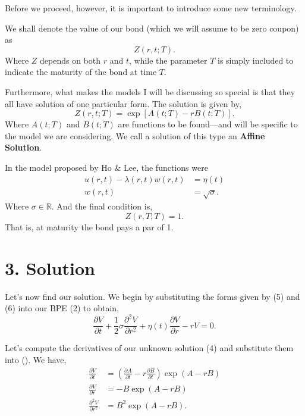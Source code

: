 \documentclass[11pt]{article}
\begin{document}
Before we proceed, however, it is important to introduce some new terminology.

We shall denote the value of our bond (which we will assume to be zero coupon) as
\begin{equation}
    Z(r,t;T).
\end{equation}
Where $Z$ depends on both $r$ and $t$, while the parameter $T$ is simply included to indicate the maturity of the bond at time $T$.

Furthermore, what makes the models I will be discussing so special is that they all have solution of one particular form. The solution is given by,
\begin{equation}
    Z(r,t;T) = \exp \left[A(t;T) - r B(t;T) \right].
\end{equation}
Where $A(t;T)$ and $B(t;T)$ are functions to be found––and will be specific to the model we are considering. We call a solution of this type an \textbf{Affine Solution}.

In the model proposed by Ho \& Lee, the functions were
\begin{align}
    u(r,t) - \lambda(r,t) w(r,t) &= \eta(t) \\
    w(r,t) &= \sqrt{\sigma}.
\end{align}
Where $\sigma \in \mathbb{R}$. And the final condition is,
\begin{equation}
    Z(r,T;T) = 1.
\end{equation}
That is, at maturity the bond pays a par of 1.

\section*{3. Solution}
Let's now find our solution. We begin by substituting the forms given by (5) and (6) into our BPE (2) to obtain,
\begin{equation}
    \frac{\partial V}{\partial t} + \frac{1}{2} \sigma \frac{\partial^2 V}{\partial r^2} + \eta(t) \frac{\partial V}{\partial r} - rV = 0.
\end{equation}

Let's compute the derivatives of our unknown solution (4) and substitute them into (). We have,
\begin{align}
    \frac{\partial V}{\partial t} &= \left( \frac{\partial A}{\partial t} - r \frac{\partial B}{\partial t} \right) \exp ( A - rB) \\
    \frac{\partial V}{\partial r} &= -B \exp (A - rB) \\
    \frac{\partial^2 V}{\partial r^2} &= B^2 \exp (A-rB).
\end{align}
\end{document}
